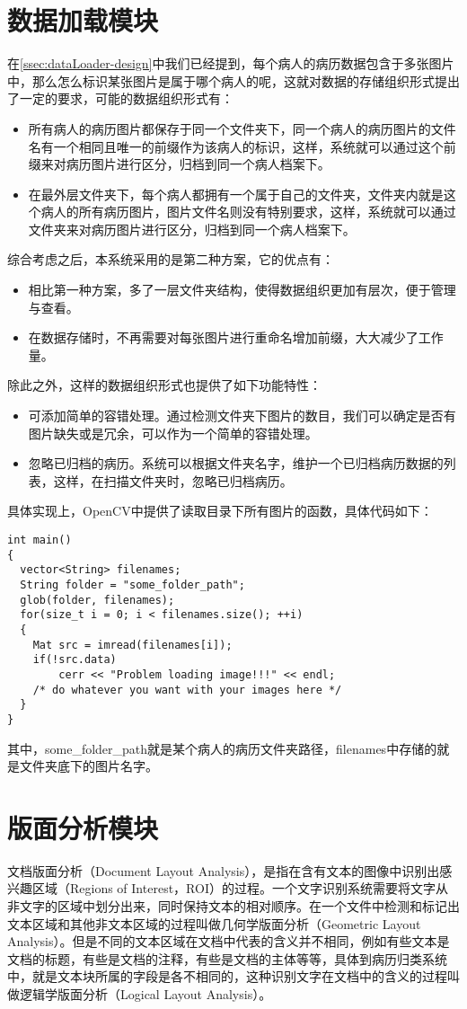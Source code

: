 \section{数据加载模块}  %
在\autoref{ssec:dataLoader-design}中我们已经提到，每个病人的病历数据包含于多张图片中，那么怎么标识某张图片是属于哪个病人的呢，这就对数据的存储组织形式提出了一定的要求，可能的数据组织形式有：
\begin{itemize}
	\item 所有病人的病历图片都保存于同一个文件夹下，同一个病人的病历图片的文件名有一个相同且唯一的前缀作为该病人的标识，这样，系统就可以通过这个前缀来对病历图片进行区分，归档到同一个病人档案下。
	\item 在最外层文件夹下，每个病人都拥有一个属于自己的文件夹，文件夹内就是这个病人的所有病历图片，图片文件名则没有特别要求，这样，系统就可以通过文件夹来对病历图片进行区分，归档到同一个病人档案下。
\end{itemize}
综合考虑之后，本系统采用的是第二种方案，它的优点有：
\begin{itemize}
	\item 相比第一种方案，多了一层文件夹结构，使得数据组织更加有层次，便于管理与查看。
	\item 在数据存储时，不再需要对每张图片进行重命名增加前缀，大大减少了工作量。
\end{itemize}
除此之外，这样的数据组织形式也提供了如下功能特性：
\begin{itemize}
	\item 可添加简单的容错处理。通过检测文件夹下图片的数目，我们可以确定是否有图片缺失或是冗余，可以作为一个简单的容错处理。
	\item 忽略已归档的病历。系统可以根据文件夹名字，维护一个已归档病历数据的列表，这样，在扫描文件夹时，忽略已归档病历。
\end{itemize}
具体实现上，OpenCV中提供了读取目录下所有图片的函数，具体代码如下：
\begin{lstlisting}
int main()
{
  vector<String> filenames;
  String folder = "some_folder_path";
  glob(folder, filenames);
  for(size_t i = 0; i < filenames.size(); ++i)
  {
    Mat src = imread(filenames[i]);
    if(!src.data)
        cerr << "Problem loading image!!!" << endl;
    /* do whatever you want with your images here */
  }
}
\end{lstlisting}
其中，some\_folder\_path就是某个病人的病历文件夹路径，filenames中存储的就是文件夹底下的图片名字。

\section{版面分析模块}  %
文档版面分析（Document Layout Analysis），是指在含有文本的图像中识别出感兴趣区域（Regions of Interest，ROI）的过程。一个文字识别系统需要将文字从非文字的区域中划分出来，同时保持文本的相对顺序\citep{baird1992anatomy}。在一个文件中检测和标记出文本区域和其他非文本区域的过程叫做几何学版面分析（Geometric Layout Analysis）\citep{cattoni1998geometric}。但是不同的文本区域在文档中代表的含义并不相同，例如有些文本是文档的标题，有些是文档的注释，有些是文档的主体等等，具体到病历归类系统中，就是文本块所属的字段是各不相同的，这种识别文字在文档中的含义的过程叫做逻辑学版面分析（Logical Layout Analysis）\citep{haralick1994document}。

